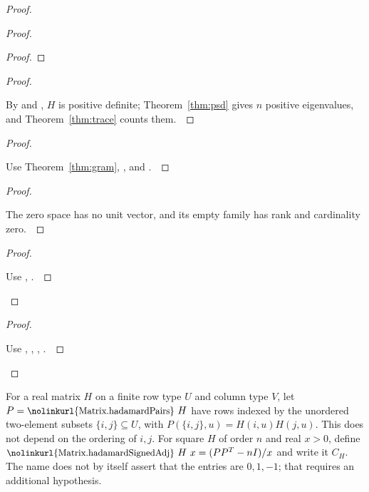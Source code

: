 \documentclass[11pt]{amsart}
\let\qed\relax
\theoremstyle{definition}
\newcommand{\code}[1]{\ifmmode\text{\small\nolinkurl{#1}}\else{\small\nolinkurl{#1}}\fi}
\begin{document}
\begin{proof}
\begin{proof}
\begin{proof}
\end{proof}
\begin{proof}
\pf\ \raggedright By  and , $H$ is positive definite; Theorem~\ref{thm:psd} gives $n$ positive eigenvalues, and Theorem~\ref{thm:trace} counts them.~\qed
\end{proof}
\begin{proof}
\pf\ \raggedright Use Theorem~\ref{thm:gram}, , and .~\qed
\end{proof}
\begin{proof}
\pf\ \raggedright The zero space has no unit vector, and its empty family has rank and cardinality zero.~\qed
\end{proof}
\qedstep
\begin{proof}
\pf\ \raggedright Use , .~\qed
\end{proof}
\end{proof}
\qedstep
\begin{proof}
\pf\ \raggedright Use , , , .~\qed
\end{proof}
\end{proof}

\begin{definition}\label{def:hadamard-pairs}
\uses{}
\mbox{}\par\nobreak
{}
For a real matrix $H$ on a finite row type $U$ and column type $V$,
let $P=\code{Matrix.hadamardPairs}\ H$ have rows indexed by the
unordered two-element subsets $\{i,j\}\subseteq U$, with
$P(\{i,j\},u)=H(i,u)H(j,u)$. This does not depend on the ordering
of $i,j$. For square $H$ of order $n$ and real $x>0$, define
$\code{Matrix.hadamardSignedAdj}\ H\ x=(PP^T-nI)/x$ and write it $C_H$.
The name does not by itself assert that the entries are $0,1,-1$;
that requires an additional hypothesis.
\end{definition}
\end{document}
